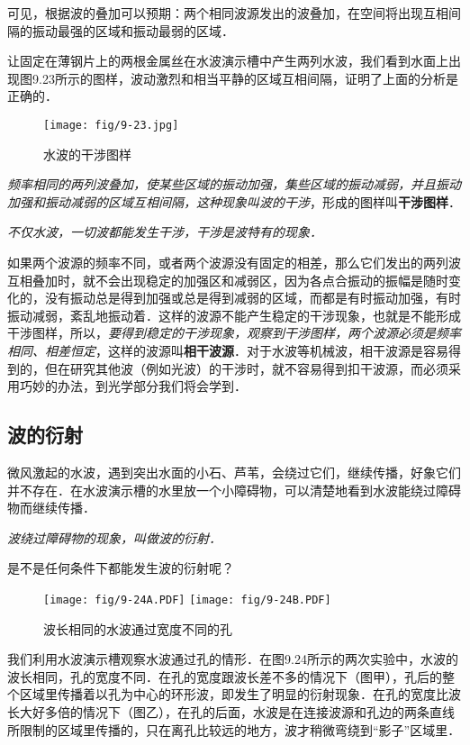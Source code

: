 可见，根据波的叠加可以预期：两个相同波源发出的波叠加，在空间将出现互相间隔的振动最强的区域和振动最弱的区域．

让固定在薄钢片上的两根金属丝在水波演示槽中产生两列水波，我们看到水面上出现图9.23所示的图样，波动激烈和相当平静的区域互相间隔，证明了上面的分析是正确的．
\begin{figure}[htp]\centering
    \texttt{[image: fig/9-23.jpg]}
    \caption{水波的干涉图样}
    \end{figure}

\textit{频率相同的两列波叠加，使某些区域的振动加强，集些区域的振动减弱，并且振动加强和振动减弱的区域互相间隔，这种现象叫波的干涉}，形成的图样叫\textbf{干涉图样}．

\textit{不仅水波，一切波都能发生干涉，干涉是波特有的现象．}

如果两个波源的频率不同，或者两个波源没有固定的相差，那么它们发出的两列波互相叠加时，就不会出现稳定的加强区和减弱区，因为各点合振动的振幅是随时变化的，没有振动总是得到加强或总是得到减弱的区域，而都是有时振动加强，有时振动减弱，紊乱地振动着．这样的波源不能产生稳定的干涉现象，也就是不能形成干涉图样，所以，\textit{要得到稳定的干涉现象，观察到干涉图样，两个波源必须是频率相同、相差恒定}，这样的波源叫\textbf{相干波源}．对于水波等机械波，相干波源是容易得到的，但在研究其他波（例如光波）的干涉时，就不容易得到扣干波源，而必须采用巧妙的办法，到光学部分我们将会学到．

\subsection{波的衍射}

微风激起的水波，遇到突出水面的小石、芦苇，会绕过它们，继续传播，好象它们并不存在．在水波演示槽的水里放一个小障碍物，可以清楚地看到水波能绕过障碍物而继续传播．

\textit{波绕过障碍物的现象，叫做波的衍射．}

是不是任何条件下都能发生波的衍射呢？
\begin{figure}[htp]\centering
    \texttt{[image: fig/9-24A.PDF]} \qquad  \texttt{[image: fig/9-24B.PDF]}
    \caption{波长相同的水波通过宽度不同的孔}
    \end{figure}

我们利用水波演示槽观察水波通过孔的情形．在图9.24所示的两次实验中，水波的波长相同，孔的宽度不同．在孔的宽度跟波长差不多的情况下（图甲），孔后的整个区域里传播着以孔为中心的环形波，即发生了明显的衍射现象．在孔的宽度比波长大好多倍的情况下（图乙），在孔的后面，水波是在连接波源和孔边的两条直线所限制的区域里传播的，只在离孔比较远的地方，波才稍微弯绕到“影子”区域里．


